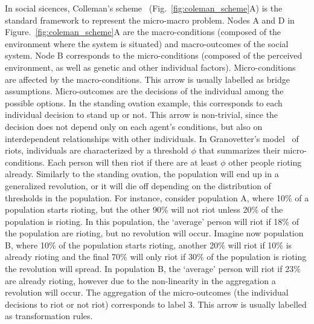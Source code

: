 In social sicences, Colleman’s scheme~\citep{coleman1990} (Fig.~\ref{fig:coleman_scheme}A) is the standard framework to represent the micro-macro problem.
Nodes A and D in Figure.~\ref{fig:coleman_scheme}A are the macro-conditions (composed of the environment where the system is situated) and macro-outcomes of the social system. 
Node B corresponds to the micro-conditions (composed of the perceived environment, as well as genetic and other individual factors). 
Micro-conditions are affected by the macro-conditions. 
This arrow is usually labelled as bridge assumptions.
Micro-outcomes are the decisions of the individual among the possible options. 
In the standing ovation example, this corresponds to each individual decision to stand up or not. 
This arrow is non-trivial, since the decision does not depend only on each agent's conditions, 
but also on interdependent relationships with other individuals.
In Granovetter's model~\cite{granovetter1978} of riots, individuals are characterized by a threshold $\phi$ that summarizes their micro-conditions. 
Each person will then riot if there are at least $\phi$ other people rioting already.
Similarly to the standing ovation, the population will end up in a generalized revolution, 
or it will die off depending on the distribution of thresholds in the population. 
For instance, consider population A, where 10\% of a population starts rioting, but the other 90\% will not riot unless 20\% of the population is rioting.
In this population, the `average' person will riot if 18\% of the population are rioting, but no revolution will occur.
Imagine now population B, where 10\% of the population starts rioting, another 20\% will riot if 10\% is already rioting and the final 70\% will only riot if 30\% of the population is rioting the revolution will spread. 
In population B, the `average' person will riot if 23\% are already rioting, however due to the non-linearity in the aggregation a revolution will occur.
The aggregation of the micro-outcomes (the individual decisions to riot or not riot) corresponds to label 3. This arrow is usually labelled as transformation rules.


